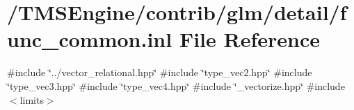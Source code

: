 \hypertarget{func__common_8inl}{}\section{/\+T\+M\+S\+Engine/contrib/glm/detail/func\+\_\+common.inl File Reference}
\label{func__common_8inl}
{\ttfamily \#include \char`\"{}../vector\+\_\+relational.\+hpp\char`\"{}}\newline
{\ttfamily \#include \char`\"{}type\+\_\+vec2.\+hpp\char`\"{}}\newline
{\ttfamily \#include \char`\"{}type\+\_\+vec3.\+hpp\char`\"{}}\newline
{\ttfamily \#include \char`\"{}type\+\_\+vec4.\+hpp\char`\"{}}\newline
{\ttfamily \#include \char`\"{}\+\_\+vectorize.\+hpp\char`\"{}}\newline
{\ttfamily \#include $<$limits$>$}\newline
